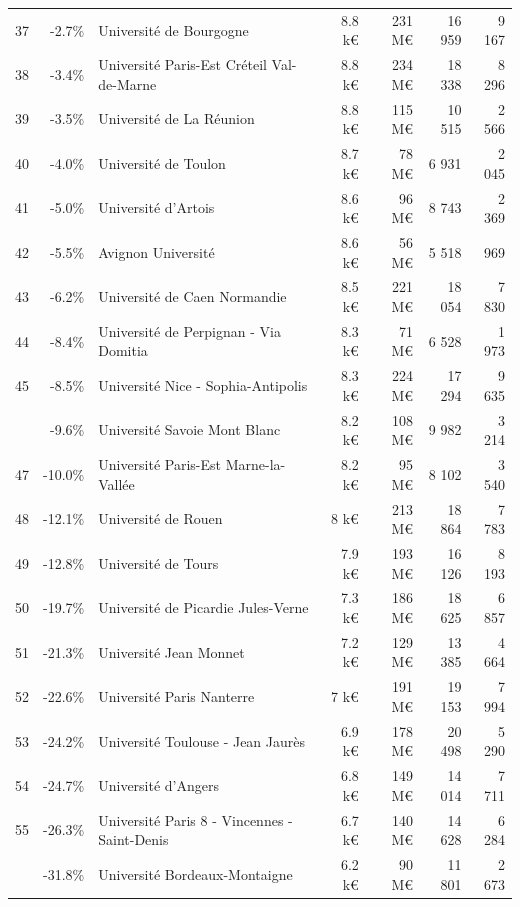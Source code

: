 \documentclass[12pt,french,]{article}
\begin{document}
\begin{longtable}{rrlrrrr}
\rowcolor{gray!6}  37 & -2.7\% & Université de Bourgogne & 8.8 k€ & 231 M€ & 16 959 & 9 167\\
38 & -3.4\% & Université Paris-Est Créteil Val-de-Marne & 8.8 k€ & 234 M€ & 18 338 & 8 296\\
\rowcolor{gray!6}  39 & -3.5\% & Université de La Réunion & 8.8 k€ & 115 M€ & 10 515 & 2 566\\
40 & -4.0\% & Université de Toulon & 8.7 k€ & 78 M€ & 6 931 & 2 045\\
\addlinespace
\rowcolor{gray!6}  41 & -5.0\% & Université d'Artois & 8.6 k€ & 96 M€ & 8 743 & 2 369\\
42 & -5.5\% & Avignon Université & 8.6 k€ & 56 M€ & 5 518 & 969\\
\rowcolor{gray!6}  43 & -6.2\% & Université de Caen Normandie & 8.5 k€ & 221 M€ & 18 054 & 7 830\\
44 & -8.4\% & Université de Perpignan - Via Domitia & 8.3 k€ & 71 M€ & 6 528 & 1 973\\
\rowcolor{gray!6}  45 & -8.5\% & Université Nice - Sophia-Antipolis & 8.3 k€ & 224 M€ & 17 294 & 9 635\\
\addlinespace
46 & -9.6\% & Université Savoie Mont Blanc & 8.2 k€ & 108 M€ & 9 982 & 3 214\\
\rowcolor{gray!6}  47 & -10.0\% & Université Paris-Est Marne-la-Vallée & 8.2 k€ & 95 M€ & 8 102 & 3 540\\
48 & -12.1\% & Université de Rouen & 8 k€ & 213 M€ & 18 864 & 7 783\\
\rowcolor{gray!6}  49 & -12.8\% & Université de Tours & 7.9 k€ & 193 M€ & 16 126 & 8 193\\
50 & -19.7\% & Université de Picardie Jules-Verne & 7.3 k€ & 186 M€ & 18 625 & 6 857\\
\addlinespace
\rowcolor{gray!6}  51 & -21.3\% & Université Jean Monnet & 7.2 k€ & 129 M€ & 13 385 & 4 664\\
52 & -22.6\% & Université Paris Nanterre & 7 k€ & 191 M€ & 19 153 & 7 994\\
\rowcolor{gray!6}  53 & -24.2\% & Université Toulouse - Jean Jaurès & 6.9 k€ & 178 M€ & 20 498 & 5 290\\
54 & -24.7\% & Université d'Angers & 6.8 k€ & 149 M€ & 14 014 & 7 711\\
\rowcolor{gray!6}  55 & -26.3\% & Université Paris 8 - Vincennes - Saint-Denis & 6.7 k€ & 140 M€ & 14 628 & 6 284\\
\addlinespace
56 & -31.8\% & Université Bordeaux-Montaigne & 6.2 k€ & 90 M€ & 11 801 & 2 673\\

\end{longtable}
\end{document}

